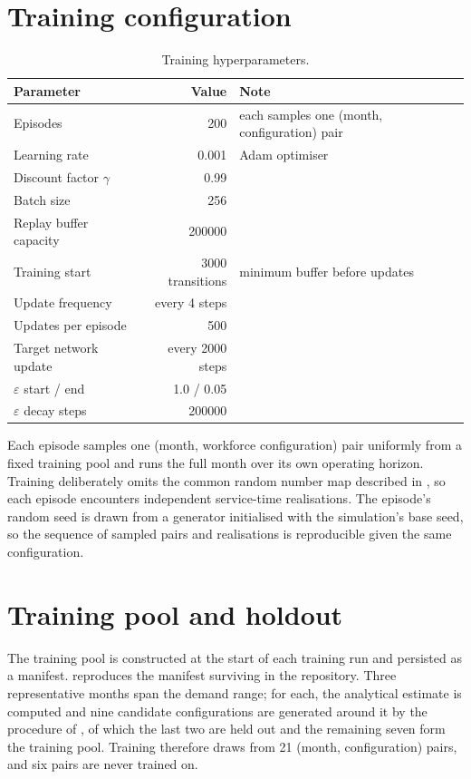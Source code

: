 \section{Training configuration}

\begin{table}[htbp]
\centering
\caption{Training hyperparameters.}
\label{tab:rl-hyper}
\small
\begin{tabularx}{0.92\textwidth}{lrX}
\toprule
\textbf{Parameter} & \textbf{Value} & \textbf{Note} \\
\midrule
Episodes                & 200 & each samples one (month, configuration) pair \\
Learning rate           & \num{0.001} & Adam optimiser \\
Discount factor \(\gamma\) & 0.99 & \\
Batch size              & 256 & \\
Replay buffer capacity  & \num{200000} & \\
Training start          & \num{3000} transitions & minimum buffer before updates \\
Update frequency        & every 4 steps & \\
Updates per episode     & 500 & \\
Target network update   & every \num{2000} steps & \\
\(\varepsilon\) start / end & 1.0 / 0.05 & \\
\(\varepsilon\) decay steps & \num{200000} & \\
\bottomrule
\end{tabularx}
\end{table}

Each episode samples one (month, workforce configuration) pair uniformly from a fixed training
pool and runs the full month over its own operating horizon. Training deliberately omits the
common random number map described in , so each episode encounters independent
service-time realisations. The episode's random seed is drawn from a generator initialised with
the simulation's base seed, so the sequence of sampled pairs and realisations is reproducible
given the same configuration.

\section{Training pool and holdout}
\label{sec:app-training-pool}

The training pool is constructed at the start of each training run and persisted as a manifest.
 reproduces the manifest surviving in the repository. Three representative
months span the demand range; for each, the analytical estimate is computed and nine candidate
configurations are generated around it by the procedure of , of which the
last two are held out and the remaining seven form the training pool. Training therefore draws
from 21 (month, configuration) pairs, and six pairs are never trained on.

